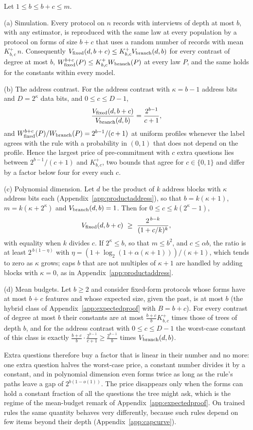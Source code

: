 \begin{theorem}\label{thm:augment}
Let $1\le b\le b+c\le m$.

\textup{(a) Simulation.} Every protocol on $n$ records with interviews of depth at most $b$, with any estimator, is reproduced with the same law at every population by a protocol on forms of size $b+c$ that uses a random number of records with mean $K^{+}_{b,c}\,n$. Consequently $V_{\rm fixed}(d,b+c)\le K^{+}_{b,c}V_{\rm branch}(d,b)$ for every contrast of degree at most $b$, $W^{b+c}_{\rm fixed}(P)\le K^{+}_{b,c}W_{\rm branch}(P)$ at every law $P$, and the same holds for the constants within every model.

\textup{(b) The address contrast.} For the address contrast with $\kappa=b-1$ address bits and $D=2^\kappa$ data bits, and $0\le c\le D-1$,
\[
 \frac{V_{\rm fixed}(d,b+c)}{V_{\rm branch}(d,b)}=\frac{2^{b-1}}{c+1},
\]
and $W^{b+c}_{\rm fixed}(P)/W_{\rm branch}(P)=2^{b-1}/(c+1)$ at uniform profiles whenever the label agrees with the rule with a probability in $(0,1)$ that does not depend on the profile. Hence the largest price of pre-commitment with $c$ extra questions lies between $2^{b-1}/(c+1)$ and $K^{+}_{b,c}$, two bounds that agree for $c\in\{0,1\}$ and differ by a factor below four for every such $c$.

\textup{(c) Polynomial dimension.} Let $d$ be the product of $k$ address blocks with $\kappa$ address bits each (Appendix~\ref{app:productaddress}), so that $b=k(\kappa+1)$, $m=k(\kappa+2^\kappa)$ and $V_{\rm branch}(d,b)=1$. Then for $0\le c\le k(2^\kappa-1)$,
\[
 V_{\rm fixed}(d,b+c)\ \ge\ \frac{2^{\,b-k}}{(1+c/k)^k},
\]
with equality when $k$ divides $c$. If $2^\kappa\le b$, so that $m\le b^2$, and $c\le\alpha b$, the ratio is at least $2^{\,b(1-\eta)}$ with $\eta=(1+\log_2(1+\alpha(\kappa+1)))/(\kappa+1)$, which tends to zero as $\kappa$ grows; caps $b$ that are not multiples of $\kappa+1$ are handled by adding blocks with $\kappa=0$, as in Appendix~\ref{app:productaddress}.

\textup{(d) Mean budgets.} Let $b\ge2$ and consider fixed-form protocols whose forms have at most $b+c$ features and whose expected size, given the past, is at most $b$ (the hybrid class of Appendix~\ref{app:expectedproof} with $B=b+c$). For every contrast of degree at most $b$ their constants are at most $\frac{b+c}{b}K^{+}_{b,c}$ times those of trees of depth $b$, and for the address contrast with $0\le c\le D-1$ the worst-case constant of this class is exactly $\frac{b+c}{b}\cdot\frac{2^{b-1}}{c+1}\ge\frac{2^{b-1}}b$ times $V_{\rm branch}(d,b)$.
\end{theorem}
Extra questions therefore buy a factor that is linear in their number and no more: one extra question halves the worst-case price, a constant number divides it by a constant, and in polynomial dimension even forms twice as long as the rule's paths leave a gap of $2^{b(1-o(1))}$. The price disappears only when the forms can hold a constant fraction of all the questions the tree might ask, which is the regime of the mean-budget remark of Appendix~\ref{app:expectedproof}. On trained rules the same quantity behaves very differently, because such rules depend on few items beyond their depth (Appendix~\ref{app:capcurve}).

